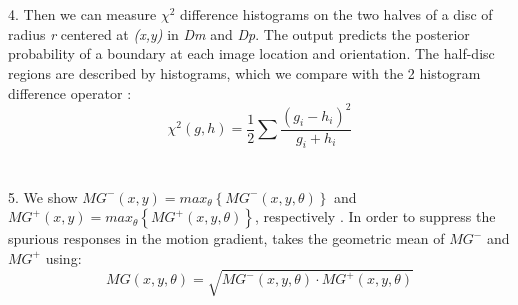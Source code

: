 \documentclass[12pt]{article}
\begin{document}
\\\\
4. Then we can measure $\chi^2$ difference histograms on the two halves of a disc of radius \emph{r} centered at \emph{(x,y)} in \emph{Dm} and \emph{Dp}. The output predicts the posterior probability of a boundary at each image location and orientation. The half-disc regions are described by histograms, which we compare with the 2 histogram difference operator \cite{3}:
\begin{equation}
\chi^2\left(g,h\right)=\frac{1}{2}\sum\frac{(g_i-h_i)^2}{g_i+h_i}
\end{equation}
\\\\
5. We show \emph{$MG^-\left(x,y\right)=max_\theta\left\{MG^-\left(x,y,\theta\right)\right\}$} and \emph{$MG^+\left(x,y\right)=max_\theta\left\{MG^+\left(x,y,\theta\right)\right\}$}, respectively \cite{1}. In order to suppress the spurious responses in the motion gradient, \cite{1} takes the geometric mean of $MG^-$ and $MG^+$ using:
\begin{equation}
MG\left(x,y,\theta\right)=\sqrt{MG^-\left(x,y,\theta\right)\cdot MG^+\left(x,y,\theta\right)}
\end{equation}


\clearpage
\nocite{*}


\end{document}
